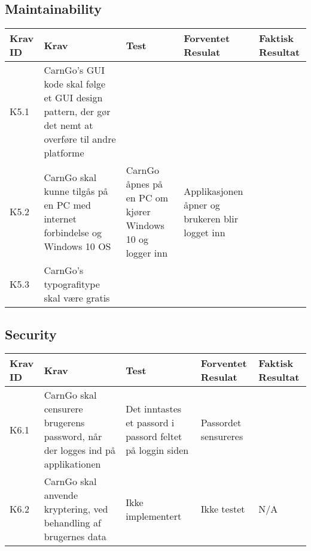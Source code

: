 \documentclass[Accepttestspecifikation/Accepttest_Main.tex]{subfiles}
\begin{document}
\subsection{Maintainability}
\begin{table}[H]
\centering
\begin{tabular}{|L{0.07\textwidth}|L{0.2\textwidth}|L{0.2\textwidth}|L{0.2\textwidth}|L{0.2\textwidth}|}
\hline
\textbf{Krav ID} & \textbf{Krav} & \textbf{Test} & \textbf{Forventet Resulat} & \textbf{Faktisk Resultat} \\ \hline
K5.1  & CarnGo's GUI kode skal følge et GUI design pattern, der gør det nemt at overføre til andre platforme  &  &  &  \\ \hline
K5.2  & CarnGo skal kunne tilgås på en PC med internet forbindelse og Windows 10 OS  & CarnGo åpnes på en PC om kjører Windows 10 og logger inn & Applikasjonen åpner og brukeren blir logget inn &  \\ \hline
K5.3  & CarnGo's typografitype skal være gratis  &  &  &  \\ \hline
\end{tabular}
\end{table}



\subsection{Security}
\begin{table}[H]
\centering
\begin{tabular}{|L{0.07\textwidth}|L{0.2\textwidth}|L{0.2\textwidth}|L{0.2\textwidth}|L{0.2\textwidth}|}
\hline
\textbf{Krav ID} & \textbf{Krav} & \textbf{Test} & \textbf{Forventet Resulat} & \textbf{Faktisk Resultat} \\ \hline
K6.1  & CarnGo skal censurere brugerens password, når der logges ind på applikationen & Det inntastes et passord i passord feltet på loggin siden & Passordet sensureres &  \\ \hline
K6.2  & CarnGo skal anvende kryptering, ved behandling af brugernes data & Ikke implementert & Ikke testet & N/A \\ \hline
\end{tabular}
\end{table}
\end{document}
